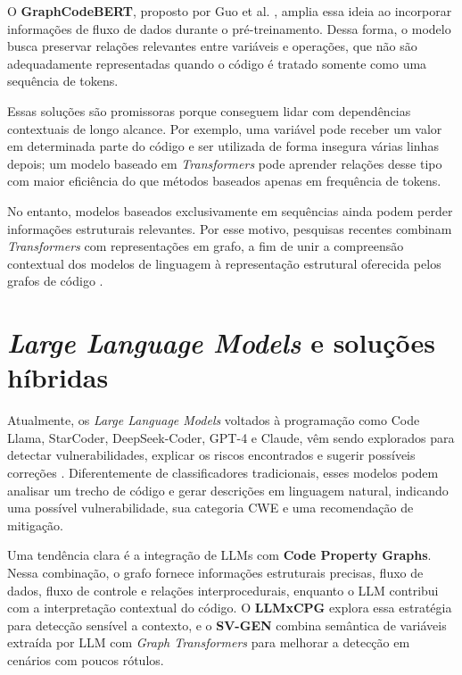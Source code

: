 O \textbf{GraphCodeBERT}, proposto por Guo et al. \cite{guo2021graphcodebert},
amplia essa ideia ao incorporar informações de fluxo de dados durante o
pré-treinamento. Dessa forma, o modelo busca preservar relações
relevantes entre variáveis e operações, que não são adequadamente
representadas quando o código é tratado somente como uma sequência de
tokens.

Essas soluções são promissoras porque conseguem lidar com dependências
contextuais de longo alcance. Por exemplo, uma variável pode receber um
valor em determinada parte do código e ser utilizada de forma insegura
várias linhas depois; um modelo baseado em \textit{Transformers} pode
aprender relações desse tipo com maior eficiência do que métodos
baseados apenas em frequência de tokens.

No entanto, modelos baseados exclusivamente em sequências ainda podem
perder informações estruturais relevantes. Por esse motivo, pesquisas
recentes combinam \textit{Transformers} com representações em grafo, a
fim de unir a compreensão contextual dos modelos de linguagem à
representação estrutural oferecida pelos grafos de código
\cite{guo2021graphcodebert,chakraborty2021survey,svgen2026}.

\section{\textit{Large Language Models} e soluções híbridas}
\label{sec:llms_hibridos}

Atualmente, os \textit{Large Language Models} voltados à programação
como Code Llama, StarCoder, DeepSeek-Coder, GPT-4 e Claude, vêm sendo
explorados para detectar vulnerabilidades, explicar os riscos
encontrados e sugerir possíveis correções \cite{mdpi2026}. Diferentemente
de classificadores tradicionais, esses modelos podem analisar um trecho
de código e gerar descrições em linguagem natural, indicando uma possível
vulnerabilidade, sua categoria CWE e uma recomendação de mitigação.

Uma tendência clara é a integração de LLMs com \textbf{Code Property
Graphs}. Nessa combinação, o grafo fornece informações estruturais
precisas, fluxo de dados, fluxo de controle e relações
interprocedurais, enquanto o LLM contribui com a interpretação
contextual do código. O \textbf{LLMxCPG} \cite{llmxcpg2025} explora
essa estratégia para detecção sensível a contexto, e o \textbf{SV-GEN}
\cite{svgen2026} combina semântica de variáveis extraída por LLM com
\textit{Graph Transformers} para melhorar a detecção em cenários com
poucos rótulos.

